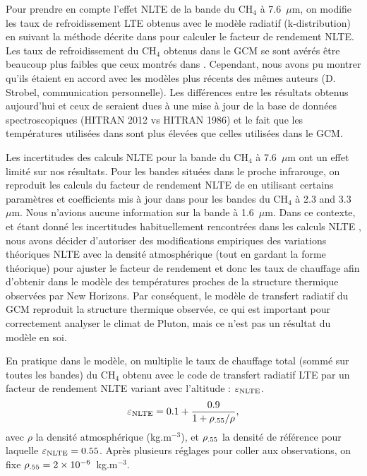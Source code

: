 Pour prendre en compte l’effet NLTE de la bande du CH$_4$ à 7.6~$\mu$m, on modifie les taux de refroidissement LTE obtenus avec le modèle radiatif (k-distribution) en suivant la méthode décrite dans \citet{Stro:96} pour calculer le facteur de rendement NLTE. Les taux de refroidissement du CH$_4$ obtenus dans le GCM se sont avérés être beaucoup plus faibles que ceux montrés dans \citet{Stro:96}.
Cependant, nous avons pu montrer qu'ils étaient en accord avec les modèles plus récents des mêmes auteurs (D. Strobel, communication personnelle). Les différences entre les résultats obtenus aujourd’hui et ceux de \citet{Stro:96} seraient dues à une mise à jour de la base de données spectroscopiques (HITRAN 2012 vs HITRAN 1986) et le fait que les températures utilisées dans \citet{Stro:96} sont plus élevées que celles utilisées dans le GCM. 

Les incertitudes des calculs NLTE pour la bande du CH$_4$ à 7.6~$\mu$m ont un effet limité sur nos résultats. Pour les bandes situées dans le proche infrarouge, on reproduit les calculs du facteur de rendement NLTE de \citet{Stro:96} en utilisant certains paramètres et coefficients mis à jour dans \cite{Zalu:11} pour les bandes du CH$_4$ à 2.3 and 3.3~$\mu$m. Nous n'avions aucune information sur la bande à 1.6~$\mu$m. Dans ce contexte, et étant donné les incertitudes habituellement rencontrées dans les calculs NLTE \citep{Bour:03}, nous avons décider d'autoriser des modifications empiriques des variations théoriques NLTE avec la densité atmosphérique (tout en gardant la forme théorique) pour ajuster le facteur de rendement et donc les taux de chauffage afin d’obtenir dans le modèle des températures proches de la structure thermique observées par New Horizons. 
Par conséquent, le modèle de transfert radiatif du GCM reproduit la structure thermique observée, ce qui est important pour correctement analyser le climat de Pluton, mais ce n’est pas un résultat du modèle en soi. 

En pratique dans le modèle, on multiplie le taux de chauffage total (sommé sur toutes les bandes) du CH$_4$ obtenu avec le code de transfert radiatif LTE par un facteur de rendement NLTE variant avec l’altitude : $\varepsilon_{\mbox{\scriptsize NLTE}}$. 
\begin{equation}
\varepsilon_{\mbox{\scriptsize NLTE}} = 0.1 + \frac{0.9}{1+{\rho_{\mbox{\scriptsize .55}}}/{\rho}}, 
\end{equation}
avec $\rho$ la densité atmosphérique (kg.m$^{-3}$), et $\rho_{\mbox{\scriptsize .55}}$ la densité de référence pour laquelle $\varepsilon_{\mbox{\scriptsize NLTE}}=0.55$. 
Après plusieurs réglages pour coller aux observations, on fixe $\rho_{\mbox{\scriptsize .55}}=2\times10^{-6}$~kg.m$^{-3}$. 


